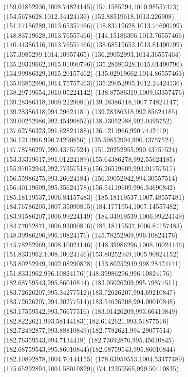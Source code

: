 {    \curveto(159.01852936,1008.74824145)(157.1585294,1010.98557473)(154.5678628,1012.34424136)
    \curveto(152.88519618,1013.226908)(151.17186289,1013.65357466)(148.83719628,1013.74690799)
    \lineto(148.83719628,1013.76557466)
    \lineto(144.15186306,1013.76557466)
    \curveto(140.44386316,1013.76557466)(138.68519653,1013.81490799)(137.3985299,1014.10957465)
    \curveto(136.29052993,1014.36557464)(135.29319662,1015.01090796)(135.28386328,1015.01490796)
    \lineto(134.99986329,1015.20157462)
    \lineto(135.02919662,1014.86557463)
    \curveto(135.03852996,1014.75757463)(135.29052995,1012.24424136)(138.29719654,1010.05224142)
    \curveto(138.87586319,1009.63357476)(139.28386318,1009.2229081)(139.28386318,1007.74824147)
    \lineto(139.28386318,994.29624181)
    \curveto(139.28386318,992.85624185)(139.00252986,992.45490852)(138.33052988,992.0495752)
    \curveto(137.62786323,991.62824188)(136.1211966,990.7442419)(136.1211966,990.74290856)
    \lineto(135.59852994,990.43757524)
    \lineto(147.78786297,990.43757524)
    \curveto(151.20252955,990.43757524)(153.33319617,991.01224189)(155.64386278,992.55624185)
    \curveto(155.97052943,992.77357518)(156.26519609,993.01757517)(156.55986275,993.26024184)
    \curveto(156.39052942,994.30557514)(156.40119609,995.35624178)(156.54119609,996.34690842)
    \moveto(185.18119537,1006.84157483)
    \lineto(185.18119537,1007.48557481)
    \curveto(184.76786205,1007.35090815)(184.1771954,1007.14557482)(183.91586207,1006.99224149)
    \curveto(184.34919539,1006.99224149)(184.77052871,1006.93090816)(185.18119537,1006.84157483)
    \moveto(148.39986296,996.10824176)
    \lineto(145.78252969,996.10824176)
    \lineto(145.78252969,1008.10024146)
    \lineto(148.39986296,1008.10024146)
    \curveto(151.8331962,1008.10024146)(153.80252949,1005.90824152)(153.80252949,1002.08290828)
    \curveto(153.80252949,998.28424171)(151.8331962,996.10824176)(148.39986296,996.10824176)
    \moveto(182.68759543,995.86010844)
    \curveto(183.05026209,995.79877511)(183.72626207,995.34277512)(183.72626207,994.69210847)
    \curveto(183.72626207,994.30277514)(183.54626208,994.00010848)(183.17559542,993.76677516)
    \curveto(183.01426209,993.66410849)(182.8222621,993.58144183)(182.6142621,993.51877516)
    \curveto(182.72492877,993.88810849)(182.7782621,994.29077514)(182.76359543,994.7134418)
    \curveto(182.73692876,995.45610845)(182.68759543,995.86010844)(182.68759543,995.86010844)
    \moveto(182.10892878,1004.70144155)
    \curveto(178.63959553,1004.53477489)(175.65292894,1001.58010829)(174.12359565,999.50410835)
}
